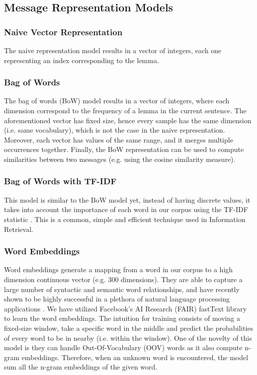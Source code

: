 \documentclass[letterpaper]{article}
\begin{document}
\subsection{Message Representation Models}  \label{Representation}

\subsubsection{Naive Vector Representation}  \label{Naive Vector Representation}

The naive representation model results in a vector of integers, each one representing an index corresponding to the lemma.

\subsubsection{Bag of Words}  \label{Bag of Words}

The bag of words (BoW) model results in a vector of integers, where each dimension correspond to the frequency of a lemma in the current sentence. The aforementioned vector has fixed size, hence every sample has the same dimension (i.e. same vocabulary), which is not the case in the naive representation. Moreover, each vector has values of the same range, and it merges multiple occurrences together. Finally, the BoW representation can be used to compute similarities between two messages (e.g. using the cosine similarity measure).

\subsubsection{Bag of Words with TF-IDF}  \label{TFIDF}

This model is similar to the BoW model yet, instead of having discrete values, it takes into account the importance of each word in our corpus using the TF-IDF statistic \cite{salton1988term}. This is a common, simple and efficient technique used in Information Retrieval.

\subsubsection{Word Embeddings}  \label{Word Embeddings}

Word embeddings generate a mapping from a word in our corpus to a high dimension continuous vector (e.g. $300$ dimensions). They are able to capture a large number of syntactic and semantic word relationships, and have recently shown to be highly successful in a plethora of natural language processing applications \cite{mikolov2013distributed} \cite{bojanowski2016enriching}. We have utilized Facebook's AI Research (FAIR) fastText library \cite{bojanowski2016enriching} to learn the word embeddings. The intuition for training consists of moving a fixed-size window, take a specific word in the middle and predict the probabilities of every word to be in nearby (i.e. within the window). One of the novelty of this model is they can handle Out-Of-Vocabulary (OOV) words as it also compute n-gram embeddings. Therefore, when an unknown word is encountered, the model sum all the n-gram embeddings of the given word.
\end{document}
